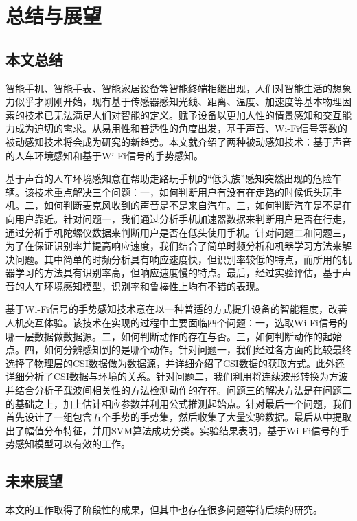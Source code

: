 \chapter{总结与展望}

\section{本文总结}
智能手机、智能手表、智能家居设备等智能终端相继出现，人们对智能生活的想象力似乎才刚刚开始，现有基于传感器感知光线、距离、温度、加速度等基本物理因素的技术已无法满足人们对智能的定义。赋予设备以更加人性的情景感知和交互能力成为迫切的需求。从易用性和普适性的角度出发，基于声音、Wi-Fi信号等数的被动感知技术将会成为研究的新趋势。本文就介绍了两种被动感知技术：基于声音的人车环境感知和基于Wi-Fi信号的手势感知。

基于声音的人车环境感知意在帮助走路玩手机的“低头族”感知突然出现的危险车辆。该技术重点解决三个问题：一，如何判断用户有没有在走路的时候低头玩手机。二，如何判断麦克风收到的声音是不是来自汽车。三，如何判断汽车是不是在向用户靠近。针对问题一，我们通过分析手机加速器数据来判断用户是否在行走，通过分析手机陀螺仪数据来判断用户是否在低头使用手机。针对问题二和问题三，为了在保证识别率并提高响应速度，我们结合了简单时频分析和机器学习方法来解决问题。其中简单的时频分析具有响应速度快，但识别率较低的特点，而所用的机器学习的方法具有识别率高，但响应速度慢的特点。最后，经过实验评估，基于声音的人车环境感知模型，识别率和鲁棒性上均有不错的表现。

基于Wi-Fi信号的手势感知技术意在以一种普适的方式提升设备的智能程度，改善人机交互体验。该技术在实现的过程中主要面临四个问题：一，选取Wi-Fi信号的哪一层数据做数据源。二，如何判断动作的存在与否。三，如何判断动作的起始点。四，如何分辨感知到的是哪个动作。针对问题一，我们经过各方面的比较最终选择了物理层的CSI数据做为数据源，并详细介绍了CSI数据的获取方式。此外还详细分析了CSI数据与环境的关系。针对问题二，我们利用将连续波形转换为方波并结合分析子载波间相关性的方法检测动作的存在。问题三的解决方法是在问题二的基础之上，加上估计相应参数并利用公式推测起始点。针对最后一个问题，我们首先设计了一组包含五个手势的手势集，然后收集了大量实验数据。最后从中提取出了幅值分布特征，并用SVM算法成功分类。实验结果表明，基于Wi-Fi信号的手势感知模型可以有效的工作。


\section{未来展望}

本文的工作取得了阶段性的成果，但其中也存在很多问题等待后续的研究。

